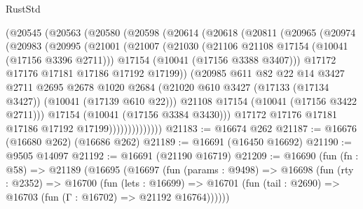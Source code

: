 \begin{lexlean}{RustStd}
\begin{coremodule}
            (@20545
              (@20563
                (@20580
                  (@20598
                    (@20614
                      (@20618
                        (@20811
                          (@20965
                            (@20974
                              (@20983
                                (@20995
                                  (@21001
                                    (@21007
                                      (@21030
                                        (@21106 @21108 @17154 (@10041 (@17156 @3396 @2711)))
                                        @17154
                                        (@10041 (@17156 @3388 @3407)))
                                      @17172
                                      @17176
                                      @17181
                                      @17186
                                      @17192
                                      @17199))
                                  (@20985
                                    @611
                                    @82
                                    @22
                                    @14
                                    @3427
                                    @2711
                                    @2695
                                    @2678
                                    @1020
                                    @2684
                                    (@21020
                                      @610
                                      @3427
                                      (@17133 (@17134 @3427))
                                      (@10041 (@17139 @610 @22)))
                                    @21108
                                    @17154
                                    (@10041 (@17156 @3422 @2711)))
                                  @17154
                                  (@10041 (@17156 @3384 @3430)))
                                @17172
                                @17176
                                @17181
                                @17186
                                @17192
                                @17199))))))))))))))
@21183 := @16674 @262
@21187 := @16676 (@16680 @262) (@16686 @262)
@21189 := @16691 (@16450 @16692)
@21190 := @9505 @14097
@21192 := @16691 (@21190 @16719)
@21209 := @16690
    (fun (fn : @58) =>
    @21189
      (@16695
        (@16697
          (fun (params : @9498) =>
          @16698
            (fun (rty : @2352) =>
            @16700
              (fun (lets : @16699) =>
              @16701 (fun (tail : @2690) => @16703 (fun (Γ : @16702) => @21192 @16764))))))

\end{coremodule}
\end{lexlean}

